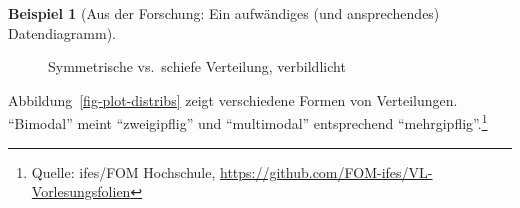 \documentclass[
  a4paper,
]{scrbook}
\theoremstyle{definition}
\newtheorem{example}{Beispiel}[chapter]
\theoremstyle{definition}
\theoremstyle{definition}
\theoremstyle{remark}
\begin{document}
\begin{example}[Aus der Forschung: Ein aufwändiges (und ansprechendes)
Datendiagramm]
\begin{figure}
\begin{minipage}{0.50\linewidth}
{}


\end{minipage}%
%
\begin{minipage}{0.50\linewidth}



\end{minipage}%

\caption{\label{fig-symm-schief}Symmetrische vs.~schiefe Verteilung,
verbildlicht}

\end{figure}%

Abbildung~\ref{fig-plot-distribs} zeigt verschiedene Formen von
Verteilungen. ``Bimodal'' meint ``zweigipflig'' und ``multimodal''
entsprechend ``mehrgipflig''.\footnote{Quelle: ifes/FOM Hochschule,
  \url{https://github.com/FOM-ifes/VL-Vorlesungsfolien}}

\begin{figure}

\end{figure}
\end{example}
\end{document}
